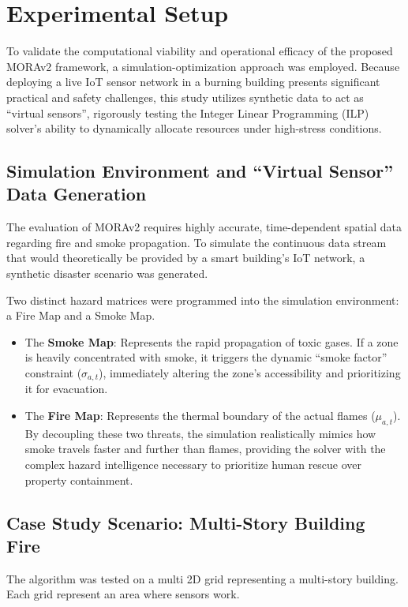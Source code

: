 \section{Experimental Setup}
\label{sec:experimental-setup}

To validate the computational viability and operational efficacy of the proposed MORAv2 framework, a simulation-optimization approach was employed. 
Because deploying a live IoT sensor network in a burning building presents significant practical and safety challenges, this study utilizes synthetic data to act as ``virtual sensors'', rigorously testing the Integer Linear Programming (ILP) solver's ability to dynamically allocate resources under high-stress conditions.

\subsection{Simulation Environment and ``Virtual Sensor'' Data Generation}
The evaluation of MORAv2 requires highly accurate, time-dependent spatial data regarding fire and smoke propagation. 
To simulate the continuous data stream that would theoretically be provided by a smart building's IoT network, a synthetic disaster scenario was generated.

Two distinct hazard matrices were programmed into the simulation environment: a Fire Map and a Smoke Map.

\begin{itemize}
    \item The \textbf{Smoke Map}: Represents the rapid propagation of toxic gases. If a zone is heavily concentrated with smoke, it triggers the dynamic ``smoke factor'' constraint ($\sigma_{a,t}$), immediately altering the zone's accessibility and prioritizing it for evacuation.
    
    \item The \textbf{Fire Map}: Represents the thermal boundary of the actual flames ($\mu_{a,t}$). By decoupling these two threats, the simulation realistically mimics how smoke travels faster and further than flames, providing the solver with the complex hazard intelligence necessary to prioritize human rescue over property containment.
\end{itemize}

\subsection{Case Study Scenario: Multi-Story Building Fire}
The algorithm was tested on a multi 2D grid representing a multi-story building. 
Each grid represent an area where sensors work.

